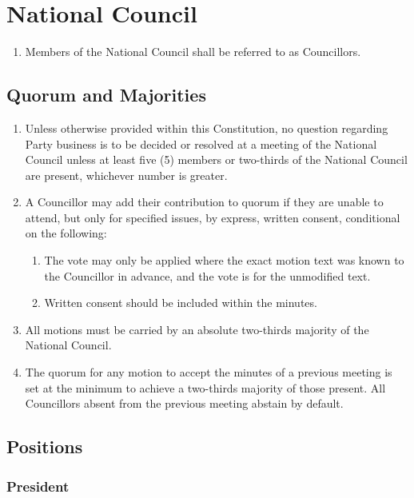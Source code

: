 \documentclass[a4paper,titlepage,8.5pt]{article}
\begin{document}
\section{National Council}

\begin{enumerate}
\item Members of the National Council shall be referred to as Councillors.
\end{enumerate}

\subsection{Quorum and Majorities}

\begin{enumerate}
\item Unless otherwise provided within this Constitution, no question regarding Party business is to be decided or resolved at a meeting of the National Council unless at least five (5) members or two-thirds of the National Council are present, whichever number is greater.
\item A Councillor may add their contribution to quorum if they are unable to attend, but only for specified issues, by express, written consent, conditional on the following:
\begin{enumerate}
\item The vote may only be applied where the exact motion text was known to the Councillor in advance, and the vote is for the unmodified text.
\item Written consent should be included within the minutes.
\end{enumerate}
\item All motions must be carried by an absolute two-thirds majority of the National Council.
\item The quorum for any motion to accept the minutes of a previous meeting is set at the minimum to achieve a two-thirds majority of those present. All Councillors absent from the previous meeting abstain by default.
\end{enumerate}


\subsection{Positions}

\subsubsection{President}
\end{document}
